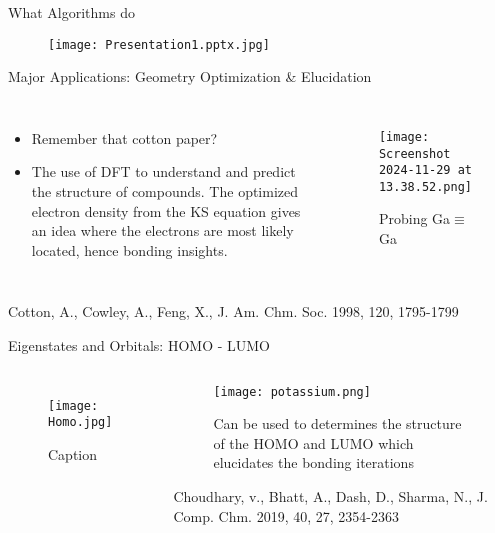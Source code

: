 \documentclass[10pt, aspectratio=169]{beamer}
\begin{document}
\begin{frame}{What Algorithms do}
\begin{figure}
    \texttt{[image: Presentation1.pptx.jpg]}
    \caption*{}
    \label{fig:enter-label}
\end{figure}
\end{frame}

\begin{frame}{Major Applications: Geometry Optimization \& Elucidation}
\begin{columns}
    \begin{itemize}
    \item Remember that cotton paper?
    \item The use of DFT to understand and predict the structure of compounds. The optimized electron density from the KS equation gives an idea where the electrons are most likely located, hence bonding insights.
    \end{itemize}
    \begin{figure}
        \centering
        \texttt{[image: Screenshot 2024-11-29 at 13.38.52.png]}
        \caption*{Probing Ga$\equiv$Ga}
        \label{fig:enter-label}
    \end{figure}
\end{columns}
    \centering
    \vfill
    \scriptsize{Cotton, A., Cowley, A., Feng, X., J. Am. Chm. Soc. 1998, 120, 1795-1799}  
    
\end{frame}
\begin{frame}{Eigenstates and Orbitals: HOMO - LUMO}
\begin{columns}
\begin{figure}
    \centering
    \texttt{[image: Homo.jpg]}
    \caption{Caption}
    \label{fig:enter-label}
\end{figure}
\vspace{-3cm}
\begin{itemize}
\begin{figure}
    \centering
    \texttt{[image: potassium.png]}
    \caption*{Can be used to determines the structure of the HOMO and LUMO which elucidates the bonding iterations}
    \label{fig:enter-label}
\end{figure}
\centering
    \vfill
    \scriptsize{Choudhary, v., Bhatt, A., Dash, D., Sharma, N., J. Comp. Chm. 2019, 40, 27, 2354-2363} 
\end{itemize}
    
\end{columns}
\end{frame}
\end{document}
